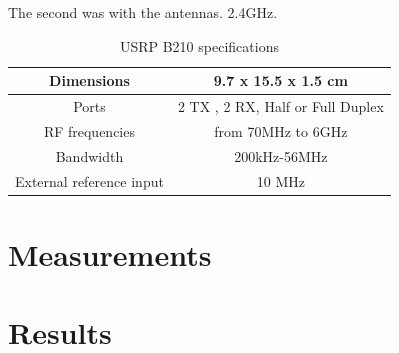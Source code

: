 The second was with the antennas. 2.4GHz. 




\begin{table}[]
	\caption{USRP B210 specifications}
	\begin{tabular}[h]{|c|c|}
		\hline
		Dimensions & 9.7 x 15.5 x 1.5 cm \\
		\hline
		Ports &
2 TX , 2 RX, Half  or Full Duplex\\
		\hline
		RF frequencies & from 70MHz to 6GHz\\
		\hline
		Bandwidth & 200kHz-56MHz\\
		\hline 
		External reference input & 10 MHz \\
		\hline
	\end{tabular}
\label{tab:USRP B210 specifications}
\end{table}


\section{Measurements}



\section{Results}

